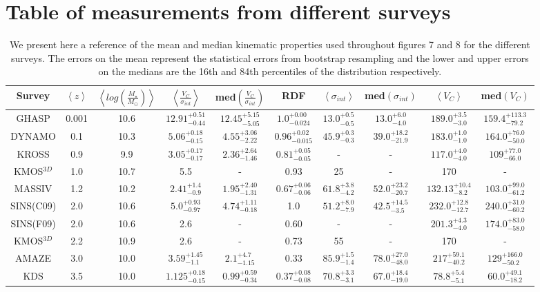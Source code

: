 \documentclass[fleqn,usenatbib]{mn2e}
\begin{document}
\section{Table of measurements from different surveys}
\begin{table*}
\centering
\caption{We present here a reference of the mean and median kinematic properties used throughout figures 7 and 8 for the different surveys.
The errors on the mean represent the statistical errors from bootstrap resampling and the lower and upper errors on the medians are the 16th and 84th percentiles of the distribution respectively.}
\label{tab:evolution_numbers}
\begin{tabular}{c c c c c c c c c c }

 \hline
Survey & $\left< z \right> $ & $\left< log\left(\frac{M_{\star}}{M_{\odot}}\right)\right>$ & $\left< \frac{V_{C}}{\sigma_{int}} \right>$ & med$\left(\frac{V_{C}}{\sigma_{int}}\right)$ & RDF & $ \left< \sigma_{int} \right>$ & med$\left(\sigma_{int}\right)$ & $\left<V_{C}\right>$ & med$\left(V_{C}\right)$  \\
 \hline
 GHASP & 0.001 & 10.6 & $12.91^{+0.51}_{-0.44}$ & $12.45^{+5.15}_{-5.05}$ & $1.0^{+0.00}_{-0.024}$ & $13.0^{+0.5}_{-0.5}$ & $13.0^{+6.0}_{-4.0}$ & $189.0^{+3.5}_{-3.0}$ & $159.4^{+113.3}_{-79.2}$ \\
 DYNAMO & 0.1 & 10.3 & $5.06^{+0.18}_{-0.15}$ & $4.55^{+3.06}_{-2.22}$ & $0.96^{+0.02}_{-0.015}$ & $45.9^{+0.3}_{-0.3}$ & $39.0^{+18.2}_{-21.9}$ & $183.0^{+1.0}_{-1.0}$ & $164.0^{+76.0}_{-50.0}$ \\
 KROSS & 0.9 & 9.9 & $3.05^{+0.17}_{-0.17}$ & $2.36^{+2.64}_{-1.46}$ & $0.81^{+0.05}_{-0.05}$ & - & - & $117.0^{+4.0}_{-4.0}$ & $109^{+77.0}_{-66.0}$ \\
 KMOS$^{3D}$ & 1.0 & 10.7 & 5.5 & - & 0.93 & 25 & - & 170 & - \\
 MASSIV & 1.2 & 10.2 & $2.41^{+1.4}_{-0.9}$ & $1.95^{+2.40}_{-1.31}$ & $0.67^{+0.06}_{-0.06}$ & $61.8^{+3.8}_{-4.2}$ & $52.0^{+23.2}_{-20.7}$ & $132.13^{+10.4}_{-8.2}$ & $103.0^{+99.0}_{-61.2}$ \\
 SINS(C09) & 2.0 & 10.6 & $5.0^{+0.93}_{-0.97}$ & $4.74^{+1.11}_{-0.18}$ & 1.0 & $51.2^{+8.0}_{-7.9}$ & $42.5^{+14.5}_{-3.5}$ & $232.0^{+12.8}_{-12.7}$ & $240.0^{+31.0}_{-60.2}$ \\
 SINS(F09) & 2.0 & 10.6 & 2.6 & - & 0.60 & - & - & $201.3^{+4.3}_{-4.0}$ & $174.0^{+83.0}_{-58.0}$ \\
 KMOS$^{3D}$ & 2.2 & 10.9 & 2.6 & - & 0.73 & 55 & - & 170 & - \\
 AMAZE & 3.0 & 10.0 & $3.59^{+1.45}_{-1.1}$ & $2.1^{+4.7}_{-1.15}$ & 0.33 & $85.9^{+1.5}_{-1.4}$ & $78.0^{+27.0}_{-48.0}$ & $217^{+59.1}_{-40.2}$ & $129^{+166.0}_{-50.2}$ \\
 KDS & 3.5 & 10.0 & $1.125^{+0.18}_{-0.15}$ & $0.99^{+0.59}_{-0.34}$ & $0.37^{+0.08}_{-0.08}$ & $70.8^{+3.3}_{-3.1}$ & $67.0^{+18.4}_{-19.0}$ & $78.8^{+5.4}_{-5.1}$ & $60.0^{+49.1}_{-18.2}$ \\
 \hline
\end{tabular}
\end{table*}
\end{document}
